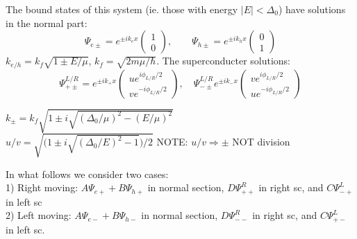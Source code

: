 \documentclass[a4paper,11pt]{article}
\begin{document}
The bound states of this system (ie. those with energy $|E|<\Delta_0$) have solutions in the normal part:
\begin{equation}
\Psi_{e\pm} = e^{\pm ik_e x}\left( \begin{array}{cc}
1 \\
0
 \end{array} \right), \quad\quad
\Psi_{h\pm} =  e^{\pm ik_h x}\left( \begin{array}{cc}
0 \\
1
 \end{array} \right)
\end{equation}
$k_{e/h} = k_f\sqrt{1\pm E/\mu}$, $k_f = \sqrt{2m\mu/\hbar}$.
The superconducter solutions:
\begin{equation}
\Psi^{L/R}_{+\pm} = e^{\pm ik_+ x}\left( \begin{array}{cc}
u e^{i\phi_{L/R}/2}\\
v e^{-i\phi_{L/R}/2}
 \end{array} \right), \quad
 \Psi^{L/R}_{-\pm} e^{\pm ik_- x}\left( \begin{array}{cc}
v e^{i\phi_{L/R}/2} \\
u e^{-i\phi_{L/R}/2}
 \end{array} \right)
\end{equation}

$k_{\pm}= k_f\sqrt{1\pm i\sqrt{(\Delta_0/\mu)^2-(E/\mu)^2}}$ \\
$u/v = \sqrt{\bigg(1\pm i \sqrt{(\Delta_0/E)^2-1}\bigg)/2}$   \hspace{3cm} NOTE: $u/v\Rightarrow\pm$ NOT division

In what follows we consider two cases: \\
1) Right moving: $A \Psi_{e+} + B \Psi_{h+}$ in normal section, $D\Psi^R_{++}$ in right sc, and $C\Psi^L_{-+}$ in left sc \\
2) Left moving: $A \Psi_{e-} + B \Psi_{h-}$ in normal section, $D\Psi^R_{--}$ in right sc, and $C\Psi^L_{+-}$ in left sc.
\end{document}
